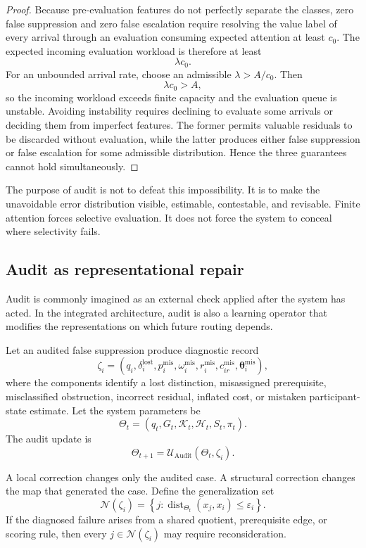 \documentclass[11pt]{article}
\theoremstyle{definition}
\DeclareMathOperator{\Audit}{Audit}
\DeclareMathOperator{\dist}{dist}
\newcommand{\K}{\mathcal{K}}
\newcommand{\thetaState}{\boldsymbol{\theta}}
\begin{document}
\begin{proof}
Because pre-evaluation features do not perfectly separate the classes, zero false suppression and zero false escalation require resolving the value label of every arrival through an evaluation consuming expected attention at least \(c_0\). The expected incoming evaluation workload is therefore at least
\[
\lambda c_0.
\]
For an unbounded arrival rate, choose an admissible \(\lambda>A/c_0\). Then
\[
\lambda c_0>A,
\]
so the incoming workload exceeds finite capacity and the evaluation queue is unstable. Avoiding instability requires declining to evaluate some arrivals or deciding them from imperfect features. The former permits valuable residuals to be discarded without evaluation, while the latter produces either false suppression or false escalation for some admissible distribution. Hence the three guarantees cannot hold simultaneously.
\end{proof}

The purpose of audit is not to defeat this impossibility. It is to make the unavoidable error distribution visible, estimable, contestable, and revisable. Finite attention forces selective evaluation. It does not force the system to conceal where selectivity fails.

\subsection{Audit as representational repair}

Audit is commonly imagined as an external check applied after the system has acted. In the integrated architecture, audit is also a learning operator that modifies the representations on which future routing depends.

Let an audited false suppression produce diagnostic record
\[
\zeta_i
=
\left(
q_i,
\delta_i^{\mathrm{lost}},
p_i^{\mathrm{mis}},
\omega_i^{\mathrm{mis}},
r_i^{\mathrm{mis}},
c_{ir}^{\mathrm{mis}},
\thetaState_i^{\mathrm{mis}}
\right),
\]
where the components identify a lost distinction, misassigned prerequisite, misclassified obstruction, incorrect residual, inflated cost, or mistaken participant-state estimate. Let the system parameters be
\[
\Theta_t
=
\left(
q_t,
G_t,
\K_t,
\mathcal{H}_t,
S_t,
\pi_t
\right).
\]
The audit update is
\[
\Theta_{t+1}
=
\mathcal{U}_{\Audit}(\Theta_t,\zeta_i).
\]

A local correction changes only the audited case. A structural correction changes the map that generated the case. Define the generalization set
\[
\mathcal{N}(\zeta_i)
=
\left\{
j:
\dist_{\Theta_t}(x_j,x_i)\leq\varepsilon_i
\right\}.
\]
If the diagnosed failure arises from a shared quotient, prerequisite edge, or scoring rule, then every \(j\in\mathcal{N}(\zeta_i)\) may require reconsideration.
\end{document}

